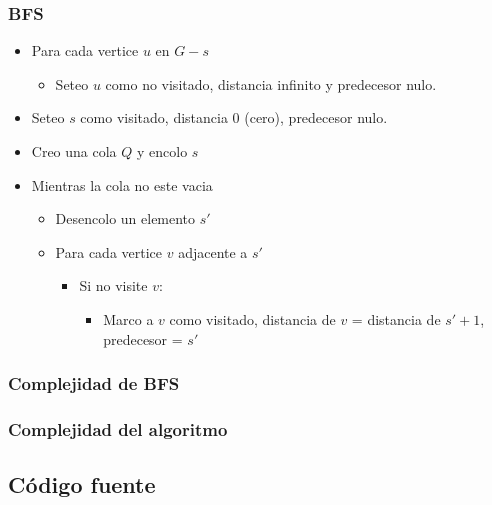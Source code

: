 \subsubsection{BFS}

\begin{itemize}
\item Para cada vertice $u$ en $G-{s}$
	\begin{itemize}
	\item Seteo $u$ como no visitado, distancia infinito y predecesor nulo.
	\end{itemize}
\item Seteo $s$ como visitado, distancia 0 (cero), predecesor nulo.
\item Creo una cola $Q$ y encolo $s$
\item Mientras la cola no este vacia
	\begin{itemize}
	\item Desencolo un elemento $s'$
	\item Para cada vertice $v$ adjacente a $s'$
		\begin{itemize}
		\item Si no visite $v$:
			\begin{itemize}
			\item Marco a $v$ como visitado, distancia de $v$ = distancia de $s' + 1$, predecesor = $s'$
			\end{itemize}
		\end{itemize}

	\end{itemize}

\end{itemize}

\begin{itemize}
\end{itemize}

\subsubsection{Complejidad de BFS}
\subsubsection{Complejidad del algoritmo}



\newpage

\subsection{C\'odigo fuente}


